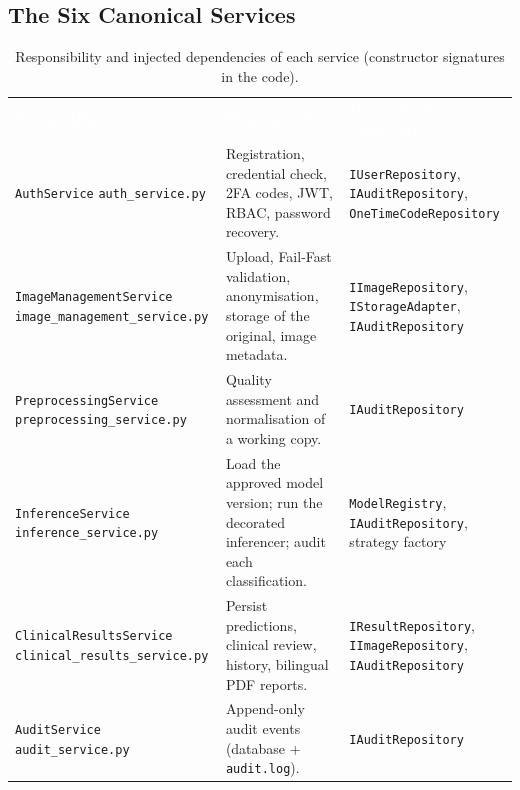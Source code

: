 \documentclass[12pt,a4paper]{article}
\newcommand{\fp}[1]{\nolinkurl{#1}}
\newcommand{\hd}[1]{\textcolor{white}{\textbf{#1}}}
\begin{document}
\subsection{The Six Canonical Services}

\begin{table}[H]
\centering
\caption{Responsibility and injected dependencies of each service (constructor signatures in the code).}
\label{tab:services}
\renewcommand{\arraystretch}{1.3}
\begin{tabularx}{\textwidth}{L{3.3cm} Y L{4.3cm}}
\hd{Service (file)} & \hd{Responsibility} & \hd{Depends on (injected)} \\
\texttt{AuthService} \newline\scriptsize\texttt{auth\_service.py} & Registration, credential check, 2FA codes, JWT, RBAC, password recovery. & \texttt{IUserRepository}, \texttt{IAuditRepository}, \fp{OneTimeCodeRepository} \\
\fp{ImageManagementService} \newline\scriptsize\fp{image_management_service.py} & Upload, Fail-Fast validation, anonymisation, storage of the original, image metadata. & \texttt{IImageRepository}, \texttt{IStorageAdapter}, \texttt{IAuditRepository} \\
\fp{PreprocessingService} \newline\scriptsize\fp{preprocessing_service.py} & Quality assessment and normalisation of a working copy. & \texttt{IAuditRepository} \\
\texttt{InferenceService} \newline\scriptsize\fp{inference_service.py} & Load the approved model version; run the decorated inferencer; audit each classification. & \texttt{ModelRegistry}, \texttt{IAuditRepository}, strategy factory \\
\fp{ClinicalResultsService} \newline\scriptsize\fp{clinical_results_service.py} & Persist predictions, clinical review, history, bilingual PDF reports. & \texttt{IResultRepository}, \texttt{IImageRepository}, \texttt{IAuditRepository} \\
\texttt{AuditService} \newline\scriptsize\texttt{audit\_service.py} & Append-only audit events (database + \texttt{audit.log}). & \texttt{IAuditRepository} \\
\end{tabularx}
\end{table}
\end{document}
